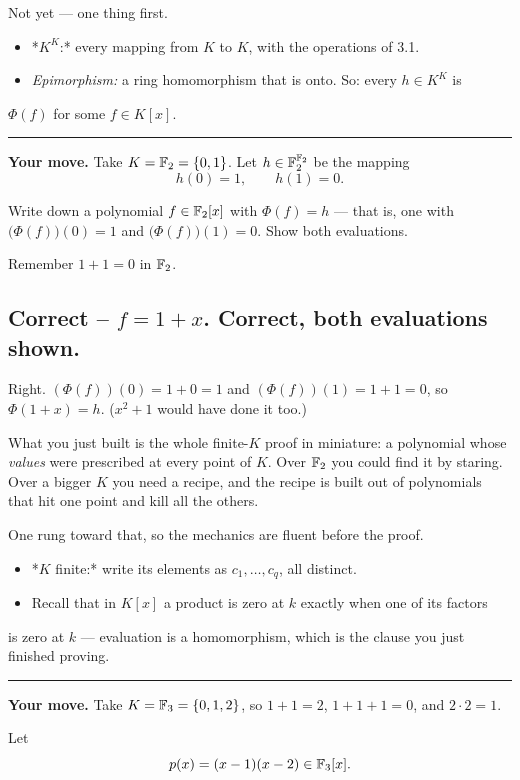 \documentclass[11pt]{article}
\begin{document}
Not yet --- one thing first.

\begin{itemize}
  \item *$K^K$:* every mapping from $K$ to $K$, with the operations of 3.1.
  \item \emph{Epimorphism:} a ring homomorphism that is onto. So: every $h \in K^K$ is
\end{itemize}
  $\Phi(f)$ for some $f \in K[x]$.

\medskip\hrule\medskip

\textbf{Your move.} Take $K = \mathbb{F}_{2} = \{0, 1\}$. Let $h \in \mathbb{F}_{2}^{\mathbb{F}_{2}}$ be the
mapping
$$h(0) = 1, \qquad h(1) = 0.$$

Write down a polynomial $f \in \mathbb{F}_{2}[x]$ with $\Phi(f) = h$ --- that is, one with
$\bigl(\Phi(f)\bigr)(0) = 1$ and $\bigl(\Phi(f)\bigr)(1) = 0$. Show both
evaluations.

Remember $1 + 1 = 0$ in $\mathbb{F}_{2}$.


\subsection*{Correct -- $f = 1+x$. Correct, both evaluations shown.}
Right. $(\Phi(f))(0) = 1+0 = 1$ and $(\Phi(f))(1) = 1+1 = 0$, so $\Phi(1+x) = h$.
($x^2+1$ would have done it too.)

What you just built is the whole finite-$K$ proof in miniature: a polynomial
whose \emph{values} were prescribed at every point of $K$. Over $\mathbb{F}_{2}$ you could
find it by staring. Over a bigger $K$ you need a recipe, and the recipe is built
out of polynomials that hit one point and kill all the others.

One rung toward that, so the mechanics are fluent before the proof.

\begin{itemize}
  \item *$K$ finite:* write its elements as $c_1,\ldots,c_q$, all distinct.
  \item Recall that in $K[x]$ a product is zero at $k$ exactly when one of its factors
\end{itemize}
  is zero at $k$ --- evaluation is a homomorphism, which is the clause you just
  finished proving.

\medskip\hrule\medskip

\textbf{Your move.} Take $K = \mathbb{F}_{3} = \{0,1,2\}$, so $1+1 = 2$, $1+1+1 = 0$, and
$2 \cdot 2 = 1$.

Let
$$p(x) = (x-1)(x-2) \in \mathbb{F}_{3}[x].$$
\end{document}
